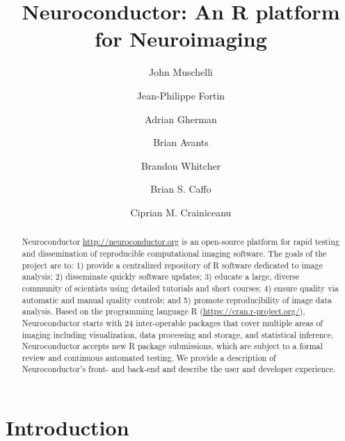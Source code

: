 \documentclass[]{elsarticle} %
\newcommand{\fixme}[1]{{\color{red} #1}}
\begin{document}
\begin{frontmatter}

  \title{Neuroconductor: An R platform for Neuroimaging}
    \author[JHU]{John Muschelli}
    \author[Penn]{Jean-Philippe Fortin}
  
    \author[JHU]{Adrian Gherman}
   \author[]{Brian Avants}
   
   \author[]{Brandon Whitcher}
   
    \author[JHU]{Brian S. Caffo}
  
    \author[JHU]{Ciprian M. Crainiceanu}
  
      \address[JHU]{Johns Hopkins Bloomberg School of Public Health, Department of
Biostatistics, 615 N Wolfe St, Baltimore, MD, 21205}
    \address[Penn]{Perelman School of Medicine, University of Pennsylvania, Department of
Biostatistics and Epidemiology, 423 Guardian Drive, Philadelphia, PA
19104}
  
  \begin{abstract}
Neuroconductor \url{http://neuroconductor.org}  is an open-source platform for rapid testing and dissemination of reproducible computational imaging software. The goals of the project are to: 1) provide a centralized repository of R software dedicated to image analysis; 2) disseminate quickly software updates; 3) educate a large, diverse community of scientists using detailed tutorials and short courses; 4) ensure quality via automatic and manual quality controls; and 5) promote reproducibility of image data analysis. Based on the  programming language R (\url{https://cran.r-project.org/}), Neuroconductor starts with \fixme{24} inter-operable packages that cover multiple areas of imaging including visualization, data processing and storage, and statistical inference. Neuroconductor accepts new R package submissions, which are subject to a formal review and continuous automated testing. We provide a description of Neuroconductor's front- and back-end  and describe the user and developer experience.  
  \end{abstract}
 
 \end{frontmatter}

\section{Introduction}\label{introduction}
\end{document}
